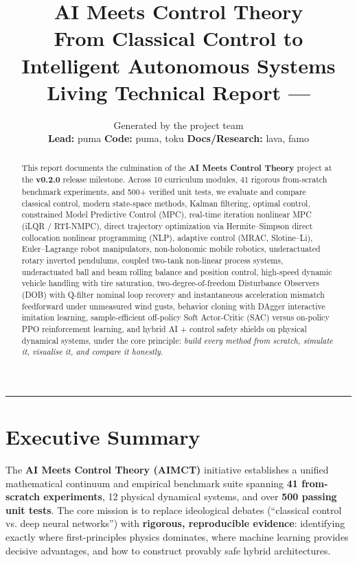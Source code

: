 \documentclass[11pt,a4paper]{article}
\title{\textbf{\LARGE AI Meets Control Theory}\\[0.35em]
  \large From Classical Control to Intelligent Autonomous Systems\\[0.5em]
  \normalsize\color{aimctrust}\textbf{Living Technical Report --- \milestone}}
\author{Generated by the project team\\
  \small\textbf{Lead:} puma \quad\textbar\quad
  \textbf{Code:} puma, toku \quad\textbar\quad
  \textbf{Docs/Research:} lava, famo}
\date{\reportdate}
\begin{document}
\maketitle
\thispagestyle{fancy}

\begin{abstract}
\noindent This report documents the culmination of the \textbf{AI Meets Control Theory} project at the \textbf{v0.2.0} release milestone.
Across 10 curriculum modules, 41 rigorous from-scratch benchmark experiments, and 500+ verified unit tests,
we evaluate and compare classical control, modern state-space methods, Kalman filtering, optimal control,
constrained Model Predictive Control (MPC), real-time iteration nonlinear MPC (iLQR / RTI-NMPC), direct trajectory
optimization via Hermite--Simpson direct collocation nonlinear programming (NLP), adaptive control (MRAC, Slotine--Li),
Euler--Lagrange robot manipulators, non-holonomic mobile robotics, underactuated rotary inverted pendulums,
coupled two-tank non-linear process systems, underactuated ball and beam rolling balance and position control,
high-speed dynamic vehicle handling with tire saturation, two-degree-of-freedom Disturbance Observers (DOB)
with Q-filter nominal loop recovery and instantaneous acceleration mismatch feedforward under unmeasured wind gusts,
behavior cloning with DAgger interactive imitation learning, sample-efficient off-policy Soft Actor-Critic (SAC)
versus on-policy PPO reinforcement learning, and hybrid AI + control safety shields on physical dynamical systems,
under the core principle: \textit{build every method from scratch, simulate it, visualise it, and compare it honestly}.
\end{abstract}

\tableofcontents
\bigskip
\hrule
\bigskip

\section*{Executive Summary}

The \textbf{AI Meets Control Theory (AIMCT)} initiative establishes a unified mathematical continuum and empirical benchmark suite spanning \textbf{41 from-scratch experiments}, 12 physical dynamical systems, and over \textbf{500 passing unit tests}. The core mission is to replace ideological debates (``classical control vs. deep neural networks'') with \textbf{rigorous, reproducible evidence}: identifying exactly where first-principles physics dominates, where machine learning provides decisive advantages, and how to construct provably safe hybrid architectures.
\end{document}
